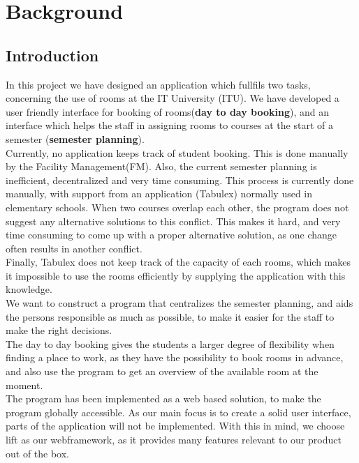 \chapter{Background}
\section{Introduction}
In this project we have designed an application which fullfils two tasks, concerning the use of rooms at the IT University (ITU). We have developed a user friendly interface for booking of rooms(\textbf{day to day booking}), and an interface which helps the staff in assigning rooms to courses at the start of a semester (\textbf{semester planning}).\\

Currently, no application keeps track of student booking. This is done manually by the Facility Management(FM). Also, the current semester planning is inefficient, decentralized and very time consuming. This process is currently done manually, with support from an application (Tabulex) normally used in elementary schools. When two courses overlap each other, the program does not suggest any alternative solutions to this conflict. This makes it hard, and very time consuming to come up with a proper alternative solution, as one change often results in another conflict.\\
Finally, Tabulex does not keep track of the capacity of each rooms, which makes it impossible to use the rooms efficiently by supplying the application with this knowledge.\\

We want to construct a program that centralizes the semester planning, and aids the persons responsible as much as possible, to make it easier for the staff to make the right decisions. \\
The day to day booking gives the students a larger degree of flexibility when finding a place to work, as they have the possibility to book rooms in advance, and also use the program to get an overview of the available room at the moment.\\


The program has been implemented as a web based solution, to make the program globally accessible. As our main focus is to create a solid user interface, parts of the application will not be implemented. With this in mind, we choose lift as our webframework, as it provides many features relevant to our product out of the box. 

\pagebreak
\label{sec:current_situation}
